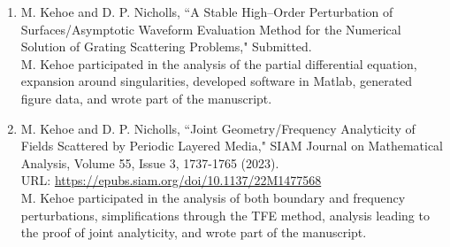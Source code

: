 \authorcontributions
{}
\renewcommand\labelenumi{[\theenumi]}

\begin{enumerate}
\item M. Kehoe and D. P. Nicholls, ``A Stable High--Order Perturbation of Surfaces/Asymptotic Waveform Evaluation Method for the Numerical Solution of Grating Scattering Problems," Submitted.
\\
\newline
M. Kehoe participated in the analysis of the partial differential equation, expansion around singularities, developed software in Matlab, generated figure data, and wrote part of the manuscript.
\item M. Kehoe and D. P. Nicholls, ``Joint Geometry/Frequency Analyticity of Fields Scattered by Periodic Layered Media," SIAM Journal on Mathematical Analysis, Volume 55, Issue 3, 1737-1765 (2023).
\\
\bigskip
URL: \href{https://epubs.siam.org/doi/10.1137/22M1477568}
{\color{blue}https://epubs.siam.org/doi/10.1137/22M1477568}\\
M. Kehoe participated in the analysis of both boundary and frequency perturbations, simplifications through the TFE method, analysis leading to the proof of joint analyticity, and wrote part of the manuscript.
\end{enumerate}
